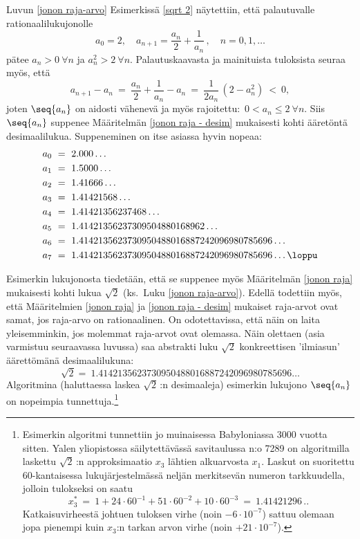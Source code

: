 \begin{Exa} \label{sqrt 2 algoritmina} Luvun \ref{jonon raja-arvo}
Esimerkissä \ref{sqrt 2} näytettiin, että palautuvalle rationaalilukujonolle
\[
a_0 = 2, \quad a_{n+1} = \frac{a_n}{2} + \frac{1}{a_n}\,, \quad n = 0,1,\ldots
\]
pätee $a_n > 0\ \forall n$ ja $a_n^2 > 2\ \forall n$. Palautuskaavasta ja mainituista
tuloksista seuraa myös, että
\[
a_{n+1}-a_n\ =\ \frac{a_n}{2}+\frac{1}{a_n}-a_n\ =\ \frac{1}{2a_n}\,(2-a_n^2)\ <\ 0,
\]
joten $\seq{a_n}$ on aidosti vähenevä ja myös rajoitettu: $\,0 < a_n \le 2\ \forall n$. Siis
$\seq{a_n}$ suppenee Määritelmän \ref{jonon raja - desim} mukaisesti kohti ääretöntä
desimaalilukua. Suppeneminen on itse asiassa hyvin nopeaa:
\begin{align*}
a_0\ &=\ 2.000 \ldots \\
a_1\ &=\ 1.5000 \ldots \\
a_2\ &=\ 1.41666 \ldots \\
a_3\ &=\ 1.41421568 \ldots \\
a_4\ &=\ 1.41421356237468 \ldots \\
a_5\ &=\ 1.41421356237309504880168962 \ldots \\
a_6\ &=\ 1.4142135623730950488016887242096980785696 \ldots \\
a_7\ &=\ 1.4142135623730950488016887242096980785696 \ldots \loppu
\end{align*}
\end{Exa}
Esimerkin lukujonosta tiedetään, että se suppenee myös Määritelmän \ref{jonon raja}
mukaisesti kohti lukua $\sqrt{2}$ (ks.\ Luku \ref{jonon raja-arvo}). Edellä todettiin myös,
että Määritelmien \ref{jonon raja} ja \ref{jonon raja - desim} mukaiset raja-arvot ovat samat,
jos raja-arvo on rationaalinen. On odotettavissa, että näin on laita yleisemminkin, jos
molemmat raja-arvot ovat olemassa. Näin olettaen (asia varmistuu seuraavassa luvussa) saa
abstrakti luku $\sqrt{2}$ konkreettisen 'ilmiasun' äärettömänä desimaalilukuna:
\[
\sqrt{2} =\ 1.4142135623730950488016887242096980785696 \ldots
\]
Algoritmina (haluttaessa laskea $\sqrt{2}\,$:n desimaaleja) esimerkin lukujono $\seq{a_n}$ on
nopeimpia tunnettuja.\footnote[2]{Esimerkin algoritmi tunnettiin jo muinaisessa Babyloniassa 
3000 vuotta sitten. Yalen yliopistossa säilytettävässä savitaulussa n:o 7289 on algoritmilla 
laskettu $\sqrt{2}\,$:n approksimaatio $x_3$ lähtien alkuarvosta $x_1$. Laskut on suoritettu
$60$-kantaisessa lukujärjestelmässä neljän merkitsevän numeron tarkkuudella, jolloin 
tulokseksi on saatu
\[
x_3^*\ =\  1 + 24 \cdot 60^{-1} + 51 \cdot 60^{-2} + 10 \cdot 60^{-3}\ =\ 1.41421296\,..
\]
Katkaisuvirheestä johtuen tuloksen virhe (noin $-6 \cdot 10^{-7}$) sattuu olemaan jopa 
pienempi kuin $x_3$:n tarkan arvon virhe (noin $+21 \cdot 10^{-7}$).} 

